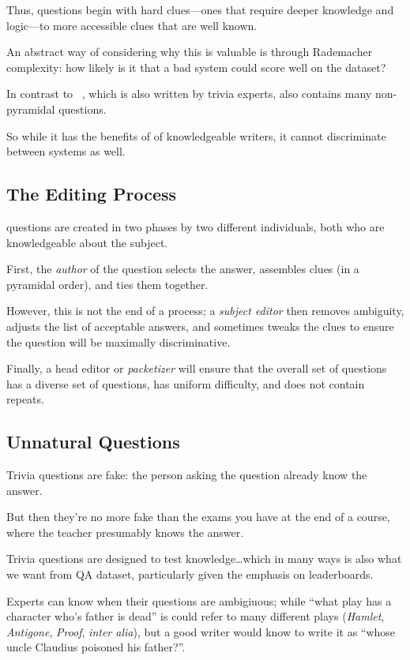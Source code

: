 Thus, questions begin with hard clues---ones that require deeper knowledge and logic---to more accessible clues that are well known.

An abstract way of considering why this is valuable is through Rademacher complexity: how likely is it that a bad system could score well on the dataset?

In contrast to \triviaqa{}~\cite{joshi-17}, which is also written by trivia experts, also contains many non-pyramidal questions.

So while it has the benefits of of knowledgeable writers, it cannot discriminate between systems as well.

\subsection{The Editing Process}

\qb{} questions are created in two phases by two different individuals, both who are knowledgeable about the subject.

First, the \emph{author} of the question selects the answer, assembles clues (in a pyramidal order), and ties them together.

However, this is not the end of a process; a \emph{subject editor} then removes ambiguity, adjusts the list of acceptable answers, and sometimes tweaks the clues to ensure the question will be maximally discriminative.

Finally, a head editor or \emph{packetizer} will ensure that the overall set of questions has a diverse set of questions, has uniform difficulty, and does not contain repeats.

\subsection{Unnatural Questions}
\label{sec:unnatural}

Trivia questions are fake: the person asking the question already know the answer.  

But then they're no more fake than the exams you have at the end of a course, where the teacher presumably knows the answer. 

Trivia questions are designed to test knowledge\dots which in many ways is also what we want from QA dataset, particularly given the emphasis on leaderboards.  

Experts can know when their questions are ambigiuous; while ``what play has a character who's father is dead'' is could refer to many different plays (\textit{Hamlet}, \textit{Antigone}, \textit{Proof}, \textit{inter alia}), but a good writer would know to write it as ``whose uncle Claudius poisoned his father?''.

